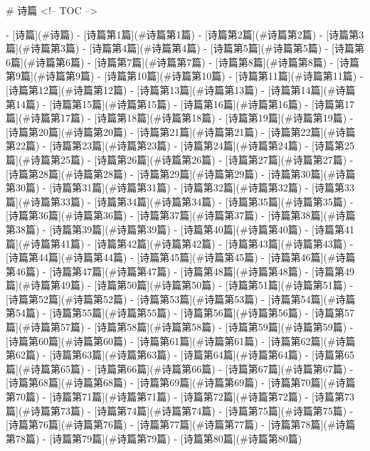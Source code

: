 # 诗篇
<!-- TOC -->

- [诗篇](#诗篇)
    - [诗篇第1篇](#诗篇第1篇)
    - [诗篇第2篇](#诗篇第2篇)
    - [诗篇第3篇](#诗篇第3篇)
    - [诗篇第4篇](#诗篇第4篇)
    - [诗篇第5篇](#诗篇第5篇)
    - [诗篇第6篇](#诗篇第6篇)
    - [诗篇第7篇](#诗篇第7篇)
    - [诗篇第8篇](#诗篇第8篇)
    - [诗篇第9篇](#诗篇第9篇)
    - [诗篇第10篇](#诗篇第10篇)
    - [诗篇第11篇](#诗篇第11篇)
    - [诗篇第12篇](#诗篇第12篇)
    - [诗篇第13篇](#诗篇第13篇)
    - [诗篇第14篇](#诗篇第14篇)
    - [诗篇第15篇](#诗篇第15篇)
    - [诗篇第16篇](#诗篇第16篇)
    - [诗篇第17篇](#诗篇第17篇)
    - [诗篇第18篇](#诗篇第18篇)
    - [诗篇第19篇](#诗篇第19篇)
    - [诗篇第20篇](#诗篇第20篇)
    - [诗篇第21篇](#诗篇第21篇)
    - [诗篇第22篇](#诗篇第22篇)
    - [诗篇第23篇](#诗篇第23篇)
    - [诗篇第24篇](#诗篇第24篇)
    - [诗篇第25篇](#诗篇第25篇)
    - [诗篇第26篇](#诗篇第26篇)
    - [诗篇第27篇](#诗篇第27篇)
    - [诗篇第28篇](#诗篇第28篇)
    - [诗篇第29篇](#诗篇第29篇)
    - [诗篇第30篇](#诗篇第30篇)
    - [诗篇第31篇](#诗篇第31篇)
    - [诗篇第32篇](#诗篇第32篇)
    - [诗篇第33篇](#诗篇第33篇)
    - [诗篇第34篇](#诗篇第34篇)
    - [诗篇第35篇](#诗篇第35篇)
    - [诗篇第36篇](#诗篇第36篇)
    - [诗篇第37篇](#诗篇第37篇)
    - [诗篇第38篇](#诗篇第38篇)
    - [诗篇第39篇](#诗篇第39篇)
    - [诗篇第40篇](#诗篇第40篇)
    - [诗篇第41篇](#诗篇第41篇)
    - [诗篇第42篇](#诗篇第42篇)
    - [诗篇第43篇](#诗篇第43篇)
    - [诗篇第44篇](#诗篇第44篇)
    - [诗篇第45篇](#诗篇第45篇)
    - [诗篇第46篇](#诗篇第46篇)
    - [诗篇第47篇](#诗篇第47篇)
    - [诗篇第48篇](#诗篇第48篇)
    - [诗篇第49篇](#诗篇第49篇)
    - [诗篇第50篇](#诗篇第50篇)
    - [诗篇第51篇](#诗篇第51篇)
    - [诗篇第52篇](#诗篇第52篇)
    - [诗篇第53篇](#诗篇第53篇)
    - [诗篇第54篇](#诗篇第54篇)
    - [诗篇第55篇](#诗篇第55篇)
    - [诗篇第56篇](#诗篇第56篇)
    - [诗篇第57篇](#诗篇第57篇)
    - [诗篇第58篇](#诗篇第58篇)
    - [诗篇第59篇](#诗篇第59篇)
    - [诗篇第60篇](#诗篇第60篇)
    - [诗篇第61篇](#诗篇第61篇)
    - [诗篇第62篇](#诗篇第62篇)
    - [诗篇第63篇](#诗篇第63篇)
    - [诗篇第64篇](#诗篇第64篇)
    - [诗篇第65篇](#诗篇第65篇)
    - [诗篇第66篇](#诗篇第66篇)
    - [诗篇第67篇](#诗篇第67篇)
    - [诗篇第68篇](#诗篇第68篇)
    - [诗篇第69篇](#诗篇第69篇)
    - [诗篇第70篇](#诗篇第70篇)
    - [诗篇第71篇](#诗篇第71篇)
    - [诗篇第72篇](#诗篇第72篇)
    - [诗篇第73篇](#诗篇第73篇)
    - [诗篇第74篇](#诗篇第74篇)
    - [诗篇第75篇](#诗篇第75篇)
    - [诗篇第76篇](#诗篇第76篇)
    - [诗篇第77篇](#诗篇第77篇)
    - [诗篇第78篇](#诗篇第78篇)
    - [诗篇第79篇](#诗篇第79篇)
    - [诗篇第80篇](#诗篇第80篇)
